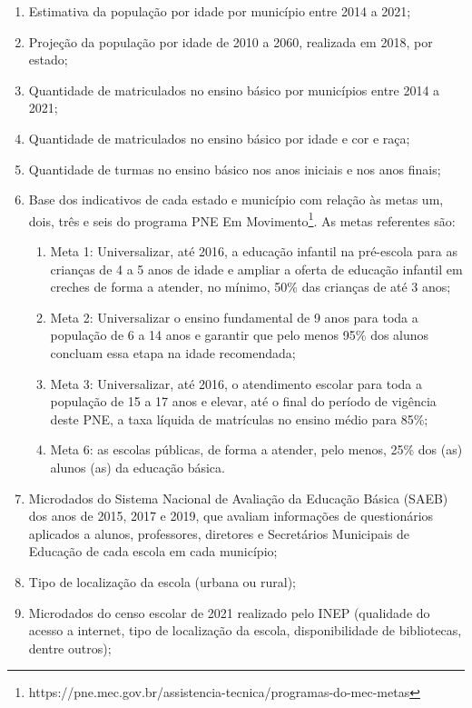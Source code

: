 \begin{enumerate}
    \item Estimativa da população por idade por município entre 2014 a 2021;
    \item Projeção da população por idade de 2010 a 2060, realizada em 2018, por estado;
    \item Quantidade de matriculados no ensino básico por municípios entre 2014 a 2021;
    \item Quantidade de matriculados no ensino básico por idade e cor e raça;
    \item Quantidade de turmas no ensino básico nos anos iniciais e nos anos finais;
    \item Base dos indicativos de cada estado e município com relação às metas um, dois, três e seis do programa PNE Em Movimento\footnote{https://pne.mec.gov.br/assistencia-tecnica/programas-do-mec-metas}. As metas referentes são:
    \begin{enumerate}
        \item Meta 1: Universalizar, até 2016, a educação infantil na pré-escola para as crianças de 4 a 5 anos de idade e ampliar a oferta de educação infantil em creches de forma a atender, no mínimo, 50\% das crianças de até 3 anos;
        \item Meta 2: Universalizar o ensino fundamental de 9 anos para toda a população de 6 a 14 anos e garantir que pelo menos 95\% dos alunos concluam essa etapa na idade recomendada;
        \item Meta 3: Universalizar, até 2016, o atendimento escolar para toda a população de 15 a 17 anos e elevar, até o final do período de vigência deste PNE, a taxa líquida de matrículas no ensino médio para 85\%;
        \item Meta 6: as escolas públicas, de forma a atender, pelo menos, 25\% dos (as) alunos (as) da educação básica.
    \end{enumerate}
    \item Microdados do Sistema Nacional de Avaliação da Educação Básica (SAEB) dos anos de 2015, 2017 e 2019, que avaliam informações de questionários aplicados a alunos, professores, diretores e Secretários Municipais de Educação de cada escola em cada município;
    \item Tipo de localização da escola (urbana ou rural);
    \item Microdados do censo escolar de 2021 realizado pelo INEP (qualidade do acesso a internet, tipo de localização da escola, disponibilidade de bibliotecas, dentre outros);%

\end{enumerate}

